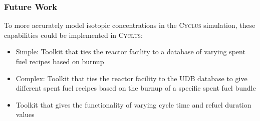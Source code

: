 \begin{frame}
    \frametitle{Future Work}
          To more accurately model isotopic concentrations in the \textsc{Cyclus} simulation, 
          these capabilities could be implemented in \textsc{Cyclus}:
          \begin{itemize}
              \item Simple: Toolkit that ties the reactor facility to a database of varying spent fuel recipes based on burnup 
              \item Complex: Toolkit that ties the reactor facility to the UDB database to give different spent fuel recipes based on the burnup of a specific spent fuel bundle
              \item Toolkit that gives the functionality of varying cycle time and refuel duration values 
          \end{itemize} 
          
  \end{frame}
  